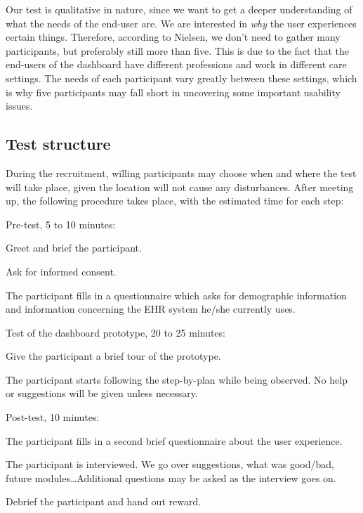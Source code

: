     Our test is qualitative in nature, since we want to get a deeper understanding of what the needs of the end-user are. We are interested in \emph{why} the user experiences certain things. Therefore, according to Nielsen, we don't need to gather many participants, but preferably still more than five. This is due to the fact that the end-users of the dashboard have different professions and work in different care settings. The needs of each participant vary greatly between these settings, which is why five participants may fall short in uncovering some important usability issues.

    \subsection{Test structure}

    During the recruitment, willing participants may choose when and where the test will take place, given the location will not cause any disturbances. After meeting up, the following procedure takes place, with the estimated time for each step:
    \begin{myenumerate}
        \item Pre-test, 5 to 10 minutes:
        \begin{myenumerate}
            \item Greet and brief the participant.
            \item Ask for informed consent.
            \item The participant fills in a questionnaire which asks for demographic information and information concerning the EHR system he/she currently uses.
        \end{myenumerate}
        \item Test of the dashboard prototype, 20 to 25 minutes:
        \begin{myenumerate}
            \item Give the participant a brief tour of the prototype.
            \item The participant starts following the step-by-plan while being observed. No help or suggestions will be given unless necessary.
        \end{myenumerate}
        \item Post-test, 10 minutes:
        \begin{myenumerate}
            \item The participant fills in a second brief questionnaire about the user experience.
            \item The participant is interviewed. We go over suggestions, what was good/bad, future modules\ldots Additional questions may be asked as the interview goes on.
            \item Debrief the participant and hand out reward.
        \end{myenumerate}
    \end{myenumerate}

